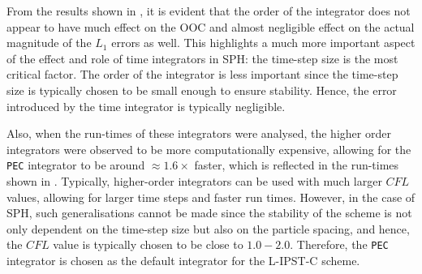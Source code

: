 From the results shown in , it is evident that the order of the integrator does not appear to have much effect on the OOC and almost negligible effect on the actual magnitude of the $L_1$ errors as well.
This highlights a much more important aspect of the effect and role of time integrators in SPH: the time-step size is the most critical factor. The order of the integrator is less important since the time-step size is typically chosen to be small enough to ensure stability. Hence, the error introduced by the time integrator is typically negligible.

Also, when the run-times of these integrators were analysed, the higher order integrators were observed to be more computationally expensive, allowing for the \texttt{PEC} integrator to be around $\approx 1.6\times$ faster, which is reflected in the run-times shown in .
Typically, higher-order integrators can be used with much larger $CFL$ values, allowing for larger time steps and faster run times. However, in the case of SPH, such generalisations cannot be made since the stability of the scheme is not only dependent on the time-step size but also on the particle spacing, and hence, the $CFL$ value is typically chosen to be close to $1.0-2.0$.
Therefore, the \texttt{PEC} integrator is chosen as the default integrator for the L-IPST-C scheme.

